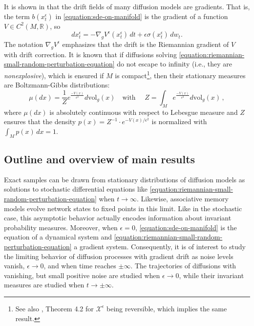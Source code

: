 \documentclass[12pt]{article}
\begin{document}
It is shown in  that the drift fields of many diffusion models are gradients. That is, the term $b(x_t^{\epsilon})$ in \eqref{equation:sde-on-manifold} is the gradient of a function $V\in C^2(M, \mathbb{R})$, so
\begin{equation}
\label{equation:riemannian-small-random-perturbation-equation}
    d{x_t^{\epsilon}} = -\nabla_g V ^{\epsilon}(x_t^{\epsilon}) \, dt + \epsilon \sigma(x_t^{\epsilon}) \, dw_t.
\end{equation}
The notation $\nabla_g V^{\epsilon}$ emphasizes that the drift is the Riemannian gradient of $V$ with drift correction. It is known that if diffusions solving \eqref{equation:riemannian-small-random-perturbation-equation} do not escape to infinity (i.e., they are \textit{nonexplosive}), which is ensured if $M$ is compact\footnote{See also \cite{kent1978time}, Theorem 4.2 for $\mathcal{X}^{\epsilon}$ being reversible, which implies the same result.}, then their stationary measures are Boltzmann-Gibbs distributions:
\begin{equation}
    \mu(dx)=\frac{1}{Z} e^{\frac{-V(x)}{\epsilon^2}} d\text{vol}_{g}(x) \hspace{1em} \text{with } \hspace{1em} Z = \int_M e^{\frac{-V(x)}{\epsilon^2}} d\text{vol}_{g}(x) \, ,
\end{equation}
where $\mu(dx)$ is absolutely continuous with respect to Lebesgue measure and $Z$ ensures that the density $p(x) = {Z}^{-1}\cdot e^{{-V(x)}/{\epsilon^2}}$ is normalized with $\int_M p(x) \, dx = 1$.


\subsection{Outline and overview of main results}
\label{subsection:overview}

Exact samples can be drawn from stationary distributions of diffusion models as solutions to stochastic differential equations like \eqref{equation:riemannian-small-random-perturbation-equation} when $t \rightarrow \infty$. Likewise, associative memory models evolve network states to fixed points in this limit. Like in the stochastic case, this asymptotic behavior actually encodes information about invariant probability measures. Moreover, when $\epsilon = 0$, \eqref{equation:sde-on-manifold} is the equation of a dynamical system and \eqref{equation:riemannian-small-random-perturbation-equation} a gradient system. Consequently, it is of interest to study the limiting behavior of diffusion processes with gradient drift as noise levels vanish, $\epsilon \rightarrow 0$, and when time reaches $\pm \infty$. The trajectories of diffusions with vanishing, but small positive noise are studied when $\epsilon \rightarrow 0$, while their invariant measures are studied when $t\rightarrow \pm\infty$. 
\end{document}
